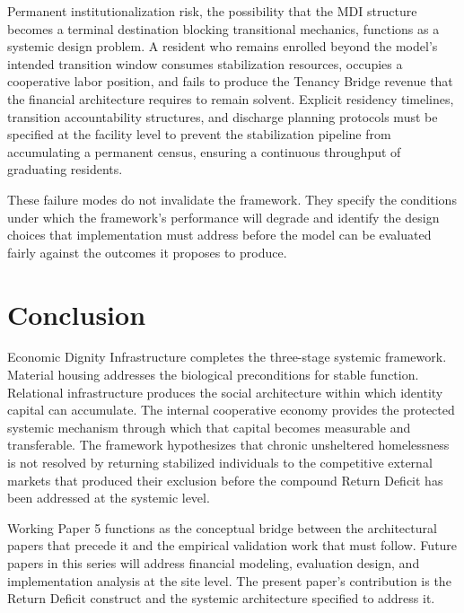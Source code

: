 \documentclass[12pt, letterpaper]{article}
\begin{document}
Permanent institutionalization risk, the possibility that the MDI structure becomes a terminal destination blocking transitional mechanics, functions as a systemic design problem. A resident who remains enrolled beyond the model's intended transition window consumes stabilization resources, occupies a cooperative labor position, and fails to produce the Tenancy Bridge revenue that the financial architecture requires to remain solvent. Explicit residency timelines, transition accountability structures, and discharge planning protocols must be specified at the facility level to prevent the stabilization pipeline from accumulating a permanent census, ensuring a continuous throughput of graduating residents.

These failure modes do not invalidate the framework. They specify the conditions under which the framework's performance will degrade and identify the design choices that implementation must address before the model can be evaluated fairly against the outcomes it proposes to produce.

\section{Conclusion}

Economic Dignity Infrastructure completes the three-stage systemic framework. Material housing addresses the biological preconditions for stable function. Relational infrastructure produces the social architecture within which identity capital can accumulate. The internal cooperative economy provides the protected systemic mechanism through which that capital becomes measurable and transferable. The framework hypothesizes that chronic unsheltered homelessness is not resolved by returning stabilized individuals to the competitive external markets that produced their exclusion before the compound Return Deficit has been addressed at the systemic level.

Working Paper 5 functions as the conceptual bridge between the architectural papers that precede it and the empirical validation work that must follow. Future papers in this series will address financial modeling, evaluation design, and implementation analysis at the site level. The present paper's contribution is the Return Deficit construct and the systemic architecture specified to address it.

\newpage
{}


\end{document}
